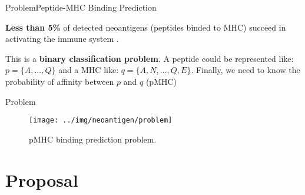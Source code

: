 \documentclass[10pt]{beamer}
\newcommand{\1}{
	\setbeamertemplate{background}{
		\texttt{[image: ../img/1]}
		\tikz[overlay] \fill[fill opacity=0.75,fill=white] (0,0) rectangle (-\paperwidth,\paperheight);
	}
}
\begin{document}
	\begin{frame}{Problem}{Peptide-MHC Binding Prediction}
		
		\begin{block}{}
			\textbf{Less than 5\%} of detected neoantigens (peptides binded to MHC) succeed in activating the immune system \cite{de2020neoantigen}.
		\end{block}
		
		
		\begin{block}{}
			This is a \textbf{binary classification problem}. A peptide could be represented like: $p = \{ A, ... , Q \}$ and a MHC like: $q = \{ A, N, ... ,Q, E \}$. Finally, we need to know the probability of affinity between $p$ and $q$ (pMHC)
		\end{block}
		
		
	\end{frame}
	
	\begin{frame}{Problem}{}	
		\begin{figure}
			\texttt{[image: ../img/neoantigen/problem]}
			\caption{pMHC binding prediction problem.}
		\end{figure}
	\end{frame}
	
	\section{Proposal}
	
\end{document}
